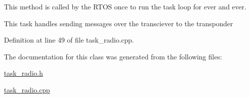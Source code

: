 This method is called by the R\+T\+OS once to run the task loop for ever and ever.

This task handles sending messages over the transciever to the transponder 

Definition at line 49 of file task\+\_\+radio.\+cpp.



The documentation for this class was generated from the following files\+:\begin{DoxyCompactItemize}
\item 
\mbox{\hyperlink{task__radio_8h}{task\+\_\+radio.\+h}}\item 
\mbox{\hyperlink{task__radio_8cpp}{task\+\_\+radio.\+cpp}}\end{DoxyCompactItemize}
